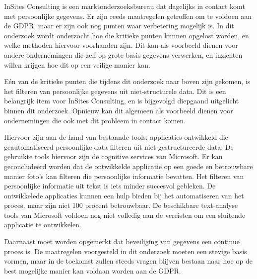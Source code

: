 InSites Consulting is een marktonderzoeksbureau dat dagelijks in contact komt met persoonlijke gegevens. Er zijn reeds maatregelen getroffen om te voldoen aan de GDPR, maar er zijn ook nog punten waar verbetering mogelijk is. In dit onderzoek wordt onderzocht hoe die kritieke punten kunnen opgelost worden, en welke methoden hiervoor voorhanden zijn. Dit kan als voorbeeld dienen voor andere ondernemingen die zelf op grote basis gegevens verwerken, en inzichten willen krijgen hoe dit op een veilige manier kan. 

Eén van de kritieke punten die tijdens dit onderzoek naar boven zijn gekomen, is het filteren van persoonlijke gegevens uit niet-structurele data. Dit is een belangrijk item voor InSites Consulting, en is bijgevolgd diepgaand uitgelicht binnen dit onderzoek. Opnieuw kan dit algemeen als voorbeeld dienen voor ondernemingen die ook met dit probleem in contact komen.

Hiervoor zijn aan de hand van bestaande tools, applicaties ontwikkeld die geautomatiseerd persoonlijke data filteren uit niet-gestructureerde data. De gebruikte tools hiervoor zijn de cognitive services van Microsoft. Er kan geconcludeerd worden dat de ontwikkelde applicatie op een goede en betrouwbare manier foto's kan filteren die persoonlijke informatie bevatten. 
Het filteren van persoonlijke informatie uit tekst is iets minder succesvol gebleken. De ontwikkelede applicaties kunnen een hulp bieden bij het automatiseren van het proces, maar zijn niet 100 procent betrouwbaar. De beschikbare text-analyse tools van Microsoft voldoen nog niet volledig aan de vereisten om een sluitende applicatie te ontwikkelen. 

Daarnaast moet worden opgemerkt dat beveiliging van gegevens een continue proces is. De maatregelen voorgesteld in dit onderzoek moeten een stevige basis vormen, maar in de toekomst zullen steeds vragen blijven bestaan naar hoe op de best mogelijke manier kan voldaan worden aan de GDPR. 
